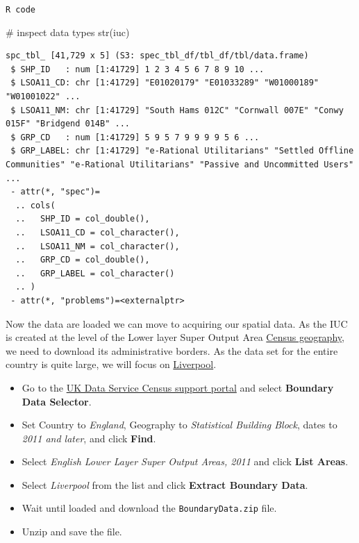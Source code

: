 \documentclass[
  letterpaper,
  DIV=11,
  numbers=noendperiod]{scrreprt}
\newenvironment{Shaded}{\begin{snugshade}}{\end{snugshade}}
\newcommand{\CommentTok}[1]{\textcolor[rgb]{0.37,0.37,0.37}{#1}}
\newcommand{\FunctionTok}[1]{\textcolor[rgb]{0.28,0.35,0.67}{#1}}
\newcommand{\NormalTok}[1]{\textcolor[rgb]{0.00,0.23,0.31}{#1}}
\providecommand{\tightlist}{%
  \setlength{\itemsep}{0pt}\setlength{\parskip}{0pt}}\usepackage{longtable,booktabs,array}
\begin{document}
\begin{codelisting}

\caption{\texttt{R code}}

\begin{Shaded}
\begin{Highlighting}[]
\CommentTok{\# inspect data types}
\FunctionTok{str}\NormalTok{(iuc)}
\end{Highlighting}
\end{Shaded}

\end{codelisting}

\begin{verbatim}
spc_tbl_ [41,729 x 5] (S3: spec_tbl_df/tbl_df/tbl/data.frame)
 $ SHP_ID   : num [1:41729] 1 2 3 4 5 6 7 8 9 10 ...
 $ LSOA11_CD: chr [1:41729] "E01020179" "E01033289" "W01000189" "W01001022" ...
 $ LSOA11_NM: chr [1:41729] "South Hams 012C" "Cornwall 007E" "Conwy 015F" "Bridgend 014B" ...
 $ GRP_CD   : num [1:41729] 5 9 5 7 9 9 9 9 5 6 ...
 $ GRP_LABEL: chr [1:41729] "e-Rational Utilitarians" "Settled Offline Communities" "e-Rational Utilitarians" "Passive and Uncommitted Users" ...
 - attr(*, "spec")=
  .. cols(
  ..   SHP_ID = col_double(),
  ..   LSOA11_CD = col_character(),
  ..   LSOA11_NM = col_character(),
  ..   GRP_CD = col_double(),
  ..   GRP_LABEL = col_character()
  .. )
 - attr(*, "problems")=<externalptr> 
\end{verbatim}

Now the data are loaded we can move to acquiring our spatial data. As
the IUC is created at the level of the Lower layer Super Output Area
\href{https://www.ons.gov.uk/methodology/geography/ukgeographies/censusgeography}{Census
geography}, we need to download its administrative borders. As the data
set for the entire country is quite large, we will focus on
\href{https://en.wikipedia.org/wiki/Liverpool}{Liverpool}.

\begin{itemize}
\tightlist
\item
  Go to the \href{https://borders.ukdataservice.ac.uk/}{UK Data Service
  Census support portal} and select \textbf{Boundary Data Selector}.
\item
  Set Country to \emph{England}, Geography to \emph{Statistical Building
  Block}, dates to \emph{2011 and later}, and click \textbf{Find}.
\item
  Select \emph{English Lower Layer Super Output Areas, 2011} and click
  \textbf{List Areas}.
\item
  Select \emph{Liverpool} from the list and click \textbf{Extract
  Boundary Data}.
\item
  Wait until loaded and download the \texttt{BoundaryData.zip} file.
\item
  Unzip and save the file.
\end{itemize}
\end{document}
